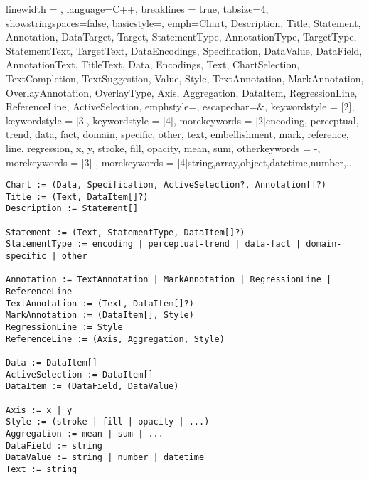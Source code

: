  {
    linewidth = \linewidth,
    language=C++,
    breaklines = true,
    tabsize=4,
    showstringspaces=false,
    basicstyle=\small\ttfamily, %
    emph={Chart, Description, Title, Statement, Annotation, DataTarget, Target, StatementType, AnnotationType, TargetType, StatementText, TargetText, DataEncodings, Specification, DataValue, DataField, AnnotationText, TitleText, Data, Encodings, Text, ChartSelection, TextCompletion, TextSuggestion, Value, Style, TextAnnotation, MarkAnnotation, OverlayAnnotation, OverlayType, Axis, Aggregation, DataItem, RegressionLine, ReferenceLine, ActiveSelection},
    emphstyle={\color{explicitBlue}},    
    escapechar={\&},
    keywordstyle = [2]{\color{customCodeOrange}},
    keywordstyle = [3]{\color{customCodeOrange}},
    keywordstyle = [4]{\color{gray}},    
    morekeywords = [2]{encoding, perceptual, trend, data, fact, domain, specific, other, text, embellishment, mark, reference, line, regression, x, y, stroke, fill, opacity, mean, sum},    
    otherkeywords = {-},
    morekeywords = [3]{-},
    morekeywords = [4]{string,array,object,datetime,number,...}
}

\noindent\begin{minipage}{\linewidth}
\begin{lstlisting}[style = mystyle]
Chart := (Data, Specification, ActiveSelection?, Annotation[]?)
Title := (Text, DataItem[]?)
Description := Statement[]

Statement := (Text, StatementType, DataItem[]?)
StatementType := encoding | perceptual-trend | data-fact | domain-specific | other

Annotation := TextAnnotation | MarkAnnotation | RegressionLine | ReferenceLine
TextAnnotation := (Text, DataItem[]?)
MarkAnnotation := (DataItem[], Style)
RegressionLine := Style
ReferenceLine := (Axis, Aggregation, Style)

Data := DataItem[]
ActiveSelection := DataItem[]
DataItem := (DataField, DataValue)

Axis := x | y
Style := (stroke | fill | opacity | ...)
Aggregation := mean | sum | ...
DataField := string
DataValue := string | number | datetime
Text := string

\end{lstlisting}
\end{minipage}